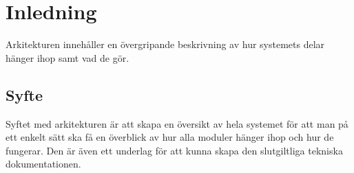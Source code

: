 \section{Inledning}
Arkitekturen innehåller en övergripande beskrivning av hur systemets delar hänger ihop samt vad de gör.

\subsection{Syfte}
Syftet med arkitekturen är att skapa en översikt av hela systemet för att man på ett enkelt sätt ska få en överblick av hur alla moduler hänger ihop och hur de fungerar. Den är även ett underlag för att kunna skapa den slutgiltliga tekniska dokumentationen.
